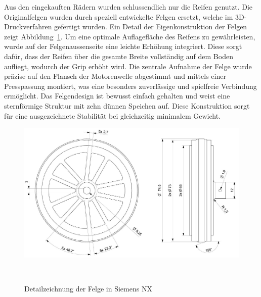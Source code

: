 \documentclass[main.tex]{subfiles} %
\begin{document}
Aus den eingekauften Rädern wurden schlussendlich nur die Reifen genutzt. Die 
Originalfelgen wurden durch speziell entwickelte Felgen ersetzt, welche im 
3D-Druckverfahren gefertigt wurden. Ein Detail der Eigenkonstruktion der Felgen zeigt 
Abbildung~\ref{Detailzeichnung-Felge}. Um eine optimale Auflagefläche des Reifens zu 
gewährleisten, wurde auf der Felgenaussenseite eine leichte Erhöhung integriert. Diese 
sorgt dafür, dass der Reifen über die gesamte Breite vollständig auf dem Boden aufliegt, 
wodurch der Grip erhöht wird. Die zentrale Aufnahme der Felge wurde präzise auf den 
Flansch der Motorenwelle abgestimmt und mittels einer Presspassung montiert, was eine 
besonders zuverlässige und spielfreie Verbindung ermöglicht. Das Felgendesign ist bewusst 
einfach gehalten und weist eine sternförmige Struktur mit zehn dünnen Speichen auf. Diese 
Konstruktion sorgt für eine ausgezeichnete Stabilität bei gleichzeitig minimalem Gewicht.

\begin{figure}[H]
    \centering
    \includegraphics[width = 1\linewidth]{./fig_Mechanik/Detailzeichnung_Felge.pdf}
    \caption{Detailzeichnung der Felge in Siemens NX}~\label{Detailzeichnung-Felge}
\end{figure}
\end{document}
